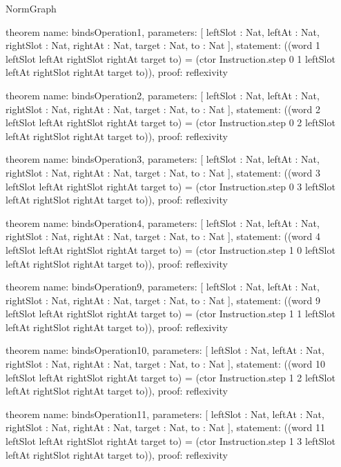\begin{lexlean}{NormGraph}
\begin{semanticmodule}
theorem{
  name: bindsOperation1,
  parameters: [
    leftSlot : Nat,
    leftAt : Nat,
    rightSlot : Nat,
    rightAt : Nat,
    target : Nat,
    to : Nat
  ],
  statement: ((word 1 leftSlot leftAt rightSlot rightAt target to) = (ctor Instruction.step 0 1 leftSlot leftAt rightSlot rightAt target to)),
  proof: reflexivity{}
}

theorem{
  name: bindsOperation2,
  parameters: [
    leftSlot : Nat,
    leftAt : Nat,
    rightSlot : Nat,
    rightAt : Nat,
    target : Nat,
    to : Nat
  ],
  statement: ((word 2 leftSlot leftAt rightSlot rightAt target to) = (ctor Instruction.step 0 2 leftSlot leftAt rightSlot rightAt target to)),
  proof: reflexivity{}
}

theorem{
  name: bindsOperation3,
  parameters: [
    leftSlot : Nat,
    leftAt : Nat,
    rightSlot : Nat,
    rightAt : Nat,
    target : Nat,
    to : Nat
  ],
  statement: ((word 3 leftSlot leftAt rightSlot rightAt target to) = (ctor Instruction.step 0 3 leftSlot leftAt rightSlot rightAt target to)),
  proof: reflexivity{}
}

theorem{
  name: bindsOperation4,
  parameters: [
    leftSlot : Nat,
    leftAt : Nat,
    rightSlot : Nat,
    rightAt : Nat,
    target : Nat,
    to : Nat
  ],
  statement: ((word 4 leftSlot leftAt rightSlot rightAt target to) = (ctor Instruction.step 1 0 leftSlot leftAt rightSlot rightAt target to)),
  proof: reflexivity{}
}

theorem{
  name: bindsOperation9,
  parameters: [
    leftSlot : Nat,
    leftAt : Nat,
    rightSlot : Nat,
    rightAt : Nat,
    target : Nat,
    to : Nat
  ],
  statement: ((word 9 leftSlot leftAt rightSlot rightAt target to) = (ctor Instruction.step 1 1 leftSlot leftAt rightSlot rightAt target to)),
  proof: reflexivity{}
}

theorem{
  name: bindsOperation10,
  parameters: [
    leftSlot : Nat,
    leftAt : Nat,
    rightSlot : Nat,
    rightAt : Nat,
    target : Nat,
    to : Nat
  ],
  statement: ((word 10 leftSlot leftAt rightSlot rightAt target to) = (ctor Instruction.step 1 2 leftSlot leftAt rightSlot rightAt target to)),
  proof: reflexivity{}
}

theorem{
  name: bindsOperation11,
  parameters: [
    leftSlot : Nat,
    leftAt : Nat,
    rightSlot : Nat,
    rightAt : Nat,
    target : Nat,
    to : Nat
  ],
  statement: ((word 11 leftSlot leftAt rightSlot rightAt target to) = (ctor Instruction.step 1 3 leftSlot leftAt rightSlot rightAt target to)),
  proof: reflexivity{}
}


\end{semanticmodule}
\end{lexlean}

